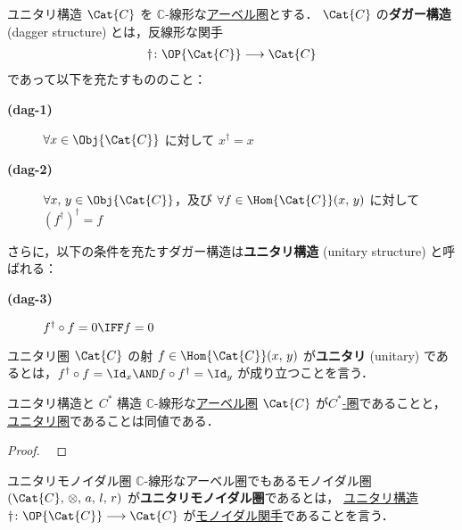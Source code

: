 \documentclass[TQFT_main]{subfiles}
\begin{document}
\begin{mydef}[label=def:unitary]{ユニタリ構造}
    $\Cat{C}$ を $\mathbb{C}$-線形な\hyperref[def:additivecat]{アーベル圏}とする．
    $\Cat{C}$ の\textbf{ダガー構造} (dagger structure) とは，反線形な関手
    \begin{align}
        \dagger \colon \OP{\Cat{C}} \lto \Cat{C}
    \end{align}
    であって以下を充たすもののこと：
    \begin{description}
        \item[\textbf{(dag-1)}] $\forall x \in \Obj{\Cat{C}}$ に対して $x^\dagger = x$
        \item[\textbf{(dag-2)}] $\forall x,\, y \in \Obj{\Cat{C}}$，及び $\forall f \in \Hom{\Cat{C}}(x,\, y)$ に対して $(f^\dagger)^\dagger = f$
    \end{description}
    さらに，以下の条件を充たすダガー構造は\textbf{ユニタリ構造} (unitary structure) と呼ばれる：
    \begin{description}
        \item[\textbf{(dag-3)}] $f^\dagger \circ f = 0 \IFF f = 0$
    \end{description}
    
    \tcblower

    ユニタリ圏 $\Cat{C}$ の射 $f \in \Hom{\Cat{C}}(x,\, y)$ が\textbf{ユニタリ} (unitary) であるとは，$f^\dagger \circ f = \Id_x \AND f \circ f^\dagger = \Id_y$ が成り立つことを言う．
\end{mydef}

\begin{myprop}[label=prop:unitary-Cstar]{ユニタリ構造と $C^*$ 構造}
    $\mathbb{C}$-線形な\hyperref[def:additivecat]{アーベル圏} $\Cat{C}$ が\hyperref[def:starcat]{$C^*$-圏}であることと，\hyperref[def:unitary]{ユニタリ圏}であることは同値である．
\end{myprop}

\begin{proof}
    ~\cite[Proposition 2.1, p.5]{Mueger1998}
\end{proof}

\begin{mydef}[label=def:unitary-monoidal]{ユニタリモノイダル圏}
    $\mathbb{C}$-線形なアーベル圏でもあるモノイダル圏 $(\Cat{C},\, \otimes ,\, a,\, l,\, r)$ が\textbf{ユニタリモノイダル圏}であるとは，
    \hyperref[def:unitary]{ユニタリ構造} $\dagger \colon \OP{\Cat{C}} \lto \Cat{C}$ が\hyperref[redef:monidal-functor]{モノイダル関手}であることを言う．
\end{mydef}
\end{document}
